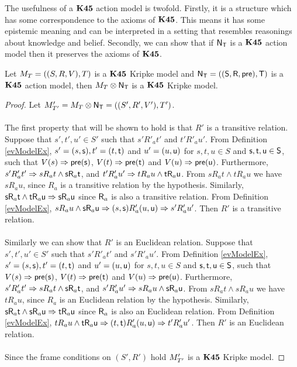 The usefulness of a $\bf K45$ action model is twofold.
Firstly, it is a structure which has some correspondence to the axioms of $\bf K45$.
This means it has some epistemic meaning and can be interpreted in a setting that resembles
reasonings about knowledge and belief.
Secondly, we can show that if $\mathrm{\mathsf{N}}_\mathrm{\mathsf{T}}$ is a $\bf K45$ action model then it preserves the axioms of
$\bf K45$.

\begin{lemma} \label{lemma:k45preserved}
	Let $M_T = ((S,R,V),T)$ is a $\bf K45$ Kripke model and $\mathrm{\mathsf{N}}_\mathrm{\mathsf{T}} = ((\mathrm{\mathsf{S}},\mathrm{\mathsf{R}},\mathrm{\mathsf{pre}}),\mathrm{\mathsf{T}})$ is a $\bf K45$ action model, then
	$M_T \otimes \mathrm{\mathsf{N}}_\mathrm{\mathsf{T}}$ is a $\bf K45$ Kripke model.
\end{lemma}
\begin{proof}
	Let $M'_{T'} = M_T \otimes \mathrm{\mathsf{N}}_\mathrm{\mathsf{T}} = ((S',R',V'),T')$.\\
	\\
	The first property that will be shown to hold is that $R'$ is a transitive relation.
	Suppose that $s',t',u' \in S'$ such that $s' R'_a t'$ and $t' R'_a u'$.
	From Definition \ref{evModelEx}, $s' = (s,\mathrm{\mathsf{s}}), t' = (t,\mathrm{\mathsf{t}})$ and $u' = (u,\mathrm{\mathsf{u}})$ for $s,t,u \in
	S$ and $\mathrm{\mathsf{s}},\mathrm{\mathsf{t}},\mathrm{\mathsf{u}} \in \mathrm{\mathsf{S}}$, such that $V(s) \Rightarrow \mathrm{\mathsf{pre}}(\mathrm{\mathsf{s}})$, $V(t) \Rightarrow
	\mathrm{\mathsf{pre}}(\mathrm{\mathsf{t}})$ and $V(u) \Rightarrow \mathrm{\mathsf{pre}}(\mathrm{\mathsf{u}})$.
	Furthermore, $s' R'_a t' \Rightarrow s R_a t \land \mathrm{\mathsf{s}} \mathrm{\mathsf{R}}_a \mathrm{\mathsf{t}}$, and $t' R'_a u' \Rightarrow
	t R_a u \land \mathrm{\mathsf{t}} \mathrm{\mathsf{R}}_a \mathrm{\mathsf{u}}$.
	From $s R_a t \land t R_a u$ we have $s R_a u$, since $R_a$ is a transitive relation by the
	hypothesis.
	Similarly, $\mathrm{\mathsf{s}} \mathrm{\mathsf{R}}_a \mathrm{\mathsf{t}} \land \mathrm{\mathsf{t}} \mathrm{\mathsf{R}}_a \mathrm{\mathsf{u}} \Rightarrow \mathrm{\mathsf{s}} \mathrm{\mathsf{R}}_a \mathrm{\mathsf{u}}$ since $\mathrm{\mathsf{R}}_a$
	is also a transitive relation.
	From Definition \ref{evModelEx}, $s R_a u \land \mathrm{\mathsf{s}} \mathrm{\mathsf{R}}_a \mathrm{\mathsf{u}} \Rightarrow (s,\mathrm{\mathsf{s}}) R'_a (u,\mathrm{\mathsf{u}})
	\Rightarrow s' R'_a u'$.
	Then $R'$ is a transitive relation.\\
	\\
	Similarly we can show that $R'$ is an Euclidean relation.
	Suppose that $s',t',u' \in S'$ such that $s' R'_a t'$ and $s' R'_a u'$.
	From Definition \ref{evModelEx}, $s' = (s,\mathrm{\mathsf{s}}), t' = (t,\mathrm{\mathsf{t}})$ and $u' = (u,\mathrm{\mathsf{u}})$ for $s,t,u \in
	S$ and $\mathrm{\mathsf{s}},\mathrm{\mathsf{t}},\mathrm{\mathsf{u}} \in \mathrm{\mathsf{S}}$, such that $V(s) \Rightarrow \mathrm{\mathsf{pre}}(\mathrm{\mathsf{s}})$, $V(t) \Rightarrow
	\mathrm{\mathsf{pre}}(\mathrm{\mathsf{t}})$ and $V(u) \Rightarrow \mathrm{\mathsf{pre}}(\mathrm{\mathsf{u}})$.
	Furthermore, $s' R'_a t' \Rightarrow s R_a t \land \mathrm{\mathsf{s}} \mathrm{\mathsf{R}}_a \mathrm{\mathsf{t}}$, and $s' R'_a u' \Rightarrow
	s R_a u \land \mathrm{\mathsf{s}} \mathrm{\mathsf{R}}_a \mathrm{\mathsf{u}}$.
	From $s R_a t \land s R_a u$ we have $t R_a u$, since $R_a$ is an Euclidean relation by the
	hypothesis.
	Similarly, $\mathrm{\mathsf{s}} \mathrm{\mathsf{R}}_a \mathrm{\mathsf{t}} \land \mathrm{\mathsf{s}} \mathrm{\mathsf{R}}_a \mathrm{\mathsf{u}} \Rightarrow \mathrm{\mathsf{t}} \mathrm{\mathsf{R}}_a \mathrm{\mathsf{u}}$ since $\mathrm{\mathsf{R}}_a$
	is also an Euclidean relation.
	From Definition \ref{evModelEx}, $t R_a u \land \mathrm{\mathsf{t}} \mathrm{\mathsf{R}}_a \mathrm{\mathsf{u}} \Rightarrow (t,\mathrm{\mathsf{t}}) R'_a (u,\mathrm{\mathsf{u}})
	\Rightarrow t' R'_a u'$.
	Then $R'$ is an Euclidean relation.\\
	\\
	Since the frame conditions on $(S',R')$ hold $M'_{T'}$ is a $\bf K45$ Kripke model.
\end{proof}

